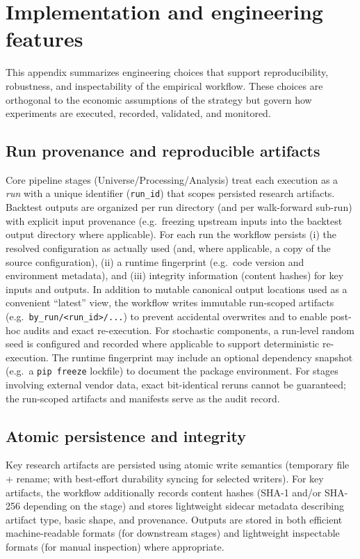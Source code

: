 \documentclass[11pt,a4paper]{article}
\begin{document}
\section{Implementation and engineering features}
\label{app:engineering}

This appendix summarizes engineering choices that support reproducibility,
robustness, and inspectability of the empirical workflow. These choices are
orthogonal to the economic assumptions of the strategy but govern how
experiments are executed, recorded, validated, and monitored.

\subsection*{Run provenance and reproducible artifacts}
Core pipeline stages (Universe/Processing/Analysis) treat each execution as a
\emph{run} with a unique identifier (\texttt{run\_id}) that scopes persisted
research artifacts. Backtest outputs are organized per run directory (and per
walk-forward sub-run) with explicit input provenance (e.g.\ freezing upstream
inputs into the backtest output directory where applicable). For each run the
workflow persists (i) the resolved configuration as actually used (and, where
applicable, a copy of the source configuration), (ii) a runtime fingerprint
(e.g.\ code version and environment metadata), and (iii) integrity information
(content hashes) for key inputs and outputs. In addition to mutable canonical
output locations used as a convenient ``latest'' view, the workflow writes
immutable run-scoped artifacts (e.g.\ \texttt{by\_run/<run\_id>/...}) to prevent
accidental overwrites and to enable post-hoc audits and exact re-execution. For
stochastic components, a run-level random seed is configured and recorded where
applicable to support deterministic re-execution. The runtime fingerprint may
include an optional dependency snapshot (e.g.\ a \texttt{pip freeze} lockfile)
to document the package environment. For stages involving external vendor data,
exact bit-identical reruns cannot be guaranteed; the run-scoped artifacts and
manifests serve as the audit record.

\subsection*{Atomic persistence and integrity}
Key research artifacts are persisted using atomic write semantics (temporary
file + rename; with best-effort durability syncing for selected writers). For
key artifacts, the workflow additionally records content hashes (SHA-1 and/or
SHA-256 depending on the stage) and stores lightweight sidecar metadata
describing artifact type, basic shape, and provenance. Outputs are stored in
both efficient machine-readable formats (for downstream stages) and lightweight
inspectable formats (for manual inspection) where appropriate.
\end{document}
